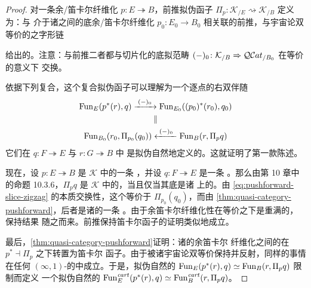 \begin{proof}
对一条余/笛卡尔纤维化 $p\colon E\twoheadrightarrow B$，前推拟伪函子
$\Pi_{p}\colon\mathcal{K}_{/E}\rightsquigarrow\mathcal{K}_{/B}$ 定义为：与
介于诸\trQuasiCategory{}之间的底余/笛卡尔纤维化
$p_{0}\colon E_{0}\to B_{0}$ 相关联的前推，与宇宙论双等价的之字形链

\begin{rveq}\label{eq:pushforward-slice-zigzag}
\end{rveq}
给出的。注意：\trPullback{}与前推二者都与切片化的底拟范畴\trFunctor{}
$(-)_{0}\colon\mathcal{K}_{/B}\Rightarrow\mathcal{Q}\mathcal{C}at_{/B_{0}}$ 在等价的意义下
交换。

依据下列复合\trEquivalence，这个复合拟伪函子可以理解为一个逐点的右双伴随
\[
\begin{gathered}
\operatorname{Fun}_{E}(p^{*}(r),q)\xrightarrow{\;(-)_{0}\;}\operatorname{Fun}_{E_{0}}((p_{0})^{*}(r_{0}),q_{0})\\
\parallel\\
\operatorname{Fun}_{B_{0}}(r_{0},\Pi_{p_{0}}(q_{0}))\xleftarrow{\;(-)_{0}\;}\operatorname{Fun}_{B}(r,\Pi_{p}q)
\end{gathered}
\]
它们在 $q\colon F\twoheadrightarrow E$ 与 $r\colon G\twoheadrightarrow B$ 中
是拟伪自然地定义的。这就证明了第一款陈述。

现在，设 $p\colon E\twoheadrightarrow B$ 是 $\mathcal{K}$ 中的一条%
\trCartesianFibration，并设 $q\colon F\twoheadrightarrow E$ 是一条%
\trCocartesianFibration。那么由第 10 章中的命题 10.3.6，$\Pi_{p}q$ 是
$\mathcal{K}$ 中的\trCocartesianFibration，当且仅当其底\trFunctor{}是诸%
\trQuasiCategory{}上的\trCocartesianFibration。由 \eqref{eq:pushforward-slice-zigzag}
的本质交换性，这个\trFunctor{}等价于 $\Pi_{p_{0}}(q_{0})$，而由%
\cref{thm:quasi-category-pushforward}，后者是诸\trQuasiCategory{}的一条%
\trCocartesianFibration。由于余笛卡尔纤维化性在等价之下是重满的，保持结果
随之而来。前推保持笛卡尔函子的证明类似地成立。

最后，\cref{thm:quasi-category-pushforward}证明：诸\trQuasiCategory{}的余笛卡尔
纤维化之间的\trCartesianFunctor{}在 $p^{*}\dashv\Pi_{p}$ 之下转置为笛卡尔
函子。由于\trCartesianFunctor{}被诸宇宙论双等价保持并反射，同样的事情在任何
$(\infty,1)$-\trCategory{}的\trInfinityCosmos{}中成立。于是，拟伪自然的%
\trEquivalence{} $\operatorname{Fun}_{E}(p^{*}(r),q)\simeq\operatorname{Fun}_{B}(r,\Pi_{p}q)$ 限制而定义
一个拟伪自然的\trEquivalence{}
$\operatorname{Fun}^{\mathit{cart}}_{E}(p^{*}(r),q)\simeq\operatorname{Fun}^{\mathit{cart}}_{B}(r,\Pi_{p}q)$。
\end{proof}


